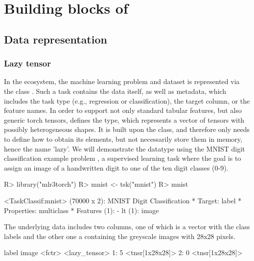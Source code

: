 \documentclass[article]{jss}
\theoremstyle{definition}
\begin{document}
\section[Building blocks of mlr3torch]{Building blocks of }\label{sec:building-blocks}

\subsection{Data representation}

\subsubsection{Lazy tensor}

In the  ecosystem, the machine learning problem and dataset is represented via the  class .
Such a task contains the data itself, as well as metadata, which includes the task type (e.g., regression or classification), the target column, or the feature names.
In order to support not only standard tabular features, but also generic torch tensors,  defines the  type, which represents a vector of tensors with possibly heterogeneous shapes.
It is built upon the  class, and therefore only needs to define how to obtain its elements, but not necessarily store them in memory, hence the name 'lazy'.
We will demonstrate the datatype using the MNIST digit classification example problem \citep{ref-mnist-2012}, a supervised learning task where the goal is to assign an image of a handwritten digit to one of the ten digit classes (0-9).

\begin{CodeInput}
R> library("mlr3torch")
R> mnist <- tsk("mnist")
R> mnist
\end{CodeInput}
\begin{CodeOutput}
<TaskClassif:mnist> (70000 x 2): MNIST Digit Classification
* Target: label
* Properties: multiclass
* Features (1):
  - lt (1): image
\end{CodeOutput}

The underlying data includes two columns, one of which is a  vector with the class labels and the other one a  containing the greyscale images with 28x28 pixels.

\begin{CodeOutput}
  label           image
 <fctr>    <lazy_tensor>
1:    5  <tnsr[1x28x28]>
2:    0  <tnsr[1x28x28]>
\end{CodeOutput}
\end{document}
